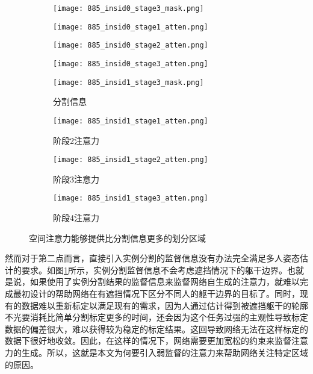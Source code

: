 \begin{figure}[h]
	\centering
	\begin{minipage}{\textwidth}
		\centering
		\begin{subfigure}[b]{0.23\linewidth}
			\texttt{[image: 885\_insid0\_stage3\_mask.png]}
		\end{subfigure}
		\begin{subfigure}[b]{0.23\linewidth}
			\texttt{[image: 885\_insid0\_stage1\_atten.png]}
		\end{subfigure}
		\begin{subfigure}[b]{0.23\linewidth}
			\texttt{[image: 885\_insid0\_stage2\_atten.png]}
		\end{subfigure}
		\begin{subfigure}[b]{0.23\linewidth}
			\texttt{[image: 885\_insid0\_stage3\_atten.png]}
		\end{subfigure}
	\end{minipage}
	
	\vskip2pt
	\begin{minipage}{\textwidth}
		\centering
		\begin{subfigure}[b]{0.23\linewidth}
			\texttt{[image: 885\_insid1\_stage3\_mask.png]}
			\caption{分割信息}
		\end{subfigure}
		\begin{subfigure}[b]{0.23\linewidth}
			\texttt{[image: 885\_insid1\_stage1\_atten.png]}
			\caption{阶段2注意力}
		\end{subfigure}
		\begin{subfigure}[b]{0.23\linewidth}
			\texttt{[image: 885\_insid1\_stage2\_atten.png]}
			\caption{阶段3注意力}
		\end{subfigure}
		\begin{subfigure}[b]{0.23\linewidth}
			\texttt{[image: 885\_insid1\_stage3\_atten.png]}
			\caption{阶段4注意力}
		\end{subfigure}
	\end{minipage}
	\begin{minipage}{0.05\linewidth}
		
		\vskip2cm
	\end{minipage}
	\caption{空间注意力能够提供比分割信息更多的划分区域}
	\label{fig:attention_mask}
\end{figure}

然而对于第二点而言，直接引入实例分割的监督信息没有办法完全满足多人姿态估计的要求。如图\ref{fig:attention_mask}所示，实例分割监督信息不会考虑遮挡情况下的躯干边界。也就是说，如果使用了实例分割结果的监督信息来监督网络自生成的注意力，就难以完成最初设计的帮助网络在有遮挡情况下区分不同人的躯干边界的目标了。同时，现有的数据难以重新标定以满足现有的需求，因为人通过估计得到被遮挡躯干的轮廓不光要消耗比简单分割标定更多的时间，还会因为这个任务过强的主观性导致标定数据的偏差很大，难以获得较为稳定的标定结果。这回导致网络无法在这样标定的数据下很好地收敛。因此，在这样的情况下，网络需要更加宽松的约束来监督注意力的生成。所以，这就是本文为何要引入弱监督的注意力来帮助网络关注特定区域的原因。

